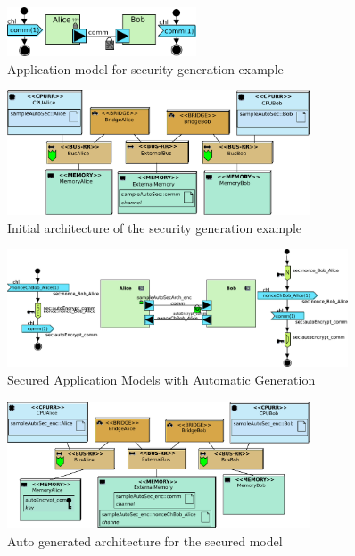\documentclass{llncs}
\begin{document}
\begin{figure}[htbp]
	\centering	\includegraphics[width=0.5\textwidth]{figures/securityStuff/secComp.pdf}
	\caption{Application model for security generation example}
	\label{fig:autogenexample}
\end{figure}

\begin{figure}[htbp]
	\centering	\includegraphics[width=0.8\textwidth]{figures/securityStuff/arch_alice_bob_sampleAuto.pdf}
	\caption{Initial architecture of the security generation example}
	\label{fig:ArchAutogenexample}
\end{figure}


\begin{figure}[htbp]
	\centering	\includegraphics[width=0.9\textwidth]{figures/securityStuff/fv_alice_bob_Autononce_with_ad.pdf}
	\caption{Secured Application Models with Automatic Generation}
	\label{fig:autogenres}
\end{figure}

\begin{figure}[htbp]
	\centering	\includegraphics[width=0.8\textwidth]{figures/securityStuff/arch_alice_bob_Autononce.pdf}
	\caption{Auto generated architecture for the secured model}
	\label{fig:ArchAutogenres}
\end{figure}
%
%
%
\newpage
\end{document}
